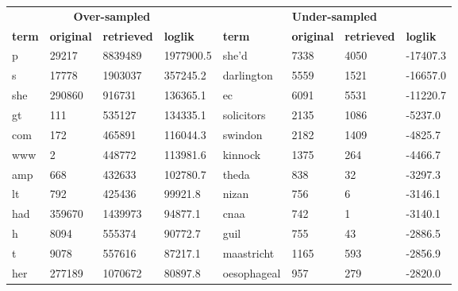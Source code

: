 \begin{table}[Htb]
    \centering
    \begin{tabular}{@{}llll||llll@{}}
        \hline
        \multicolumn{4}{c||}{{\bf Over-sampled}}                       & \multicolumn{4}{c}{{\bf Under-sampled}}                         \\ 
        {\bf term} & {\bf original} & {\bf retrieved} & {\bf loglik} & {\bf term}    & {\bf original} & {\bf retrieved} & {\bf loglik} \\ \hline
        p          & 29217          & 8839489         & 1977900.5    & she'd         & 7338           & 4050            & -17407.3     \\
        s          & 17778          & 1903037         & 357245.2     & darlington    & 5559           & 1521            & -16657.0     \\
        she        & 290860         & 916731          & 136365.1     & ec            & 6091           & 5531            & -11220.7     \\
        gt         & 111            & 535127          & 134335.1     & solicitors    & 2135           & 1086            & -5237.0      \\
        com        & 172            & 465891          & 116044.3     & swindon       & 2182           & 1409            & -4825.7      \\
        www        & 2              & 448772          & 113981.6     & kinnock       & 1375           & 264             & -4466.7      \\
        amp        & 668            & 432633          & 102780.7     & theda         & 838            & 32              & -3297.3      \\
        lt         & 792            & 425436          & 99921.8      & nizan         & 756            & 6               & -3146.1      \\
        had        & 359670         & 1439973         & 94877.1      & cnaa          & 742            & 1               & -3140.1      \\
        h          & 8094           & 555374          & 90772.7      & guil          & 755            & 43              & -2886.5      \\
        t          & 9078           & 557616          & 87217.1      & maastricht    & 1165           & 593             & -2856.9      \\
        her        & 277189         & 1070672         & 80897.8      & oesophageal   & 957            & 279             & -2820.0      \\

\end{tabular}
\end{table}

